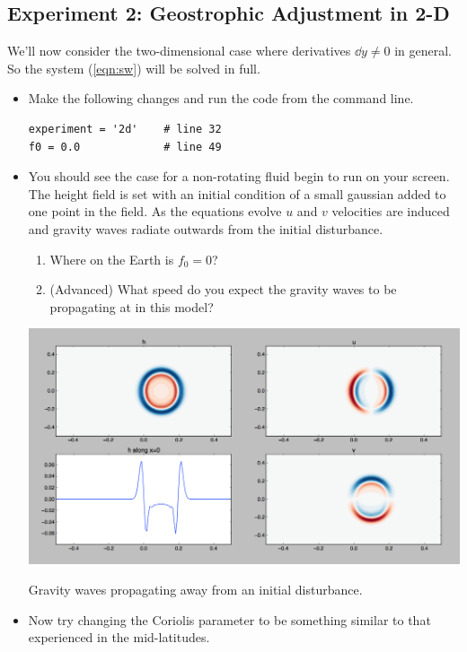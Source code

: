 \documentclass[a4paper, sfsidenotes, twoside]{tufte-handout}
\begin{document}
  \subsection{Experiment 2: Geostrophic Adjustment in 2-D}
  \label{sub:exp2}
  We'll now consider the two-dimensional case where derivatives $\dd{}{y} \ne 0$ in general.
  So the system (\ref{eqn:sw}) will be solved in full.
  \begin{itemize}
    \item Make the following changes and run the code from the command line.
    \begin{verbatim}
experiment = '2d'    # line 32
f0 = 0.0             # line 49
    \end{verbatim}
    \item You should see the case for a non-rotating fluid begin to run on
    your screen.  The height field is set with an initial condition of a small
    gaussian added to one point in the field.  As the equations evolve $u$ and
    $v$ velocities are induced and gravity waves radiate outwards from the initial disturbance.
    \begin{enumerate}
      \item Where on the Earth is $f_0 = 0$?
      \item (Advanced) What speed do you expect the gravity waves to be propagating at in this model?
    \end{enumerate}
    \begin{marginfigure}
      \includegraphics{gravity_waves}
      \caption{Gravity waves propagating away from an initial disturbance.}
      \label{fig:gravwaves}
    \end{marginfigure}
    \item Now try changing the Coriolis parameter to be something similar to that experienced in the mid-latitudes.
    \begin{enumerate}

\end{enumerate}
\end{itemize}
\end{document}

